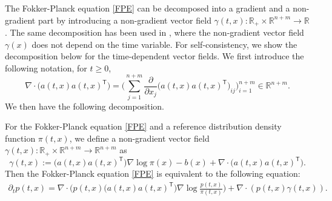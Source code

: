 \documentclass[11pt,reqno]{amsart}
\newcommand{\ts}{\mathsf{T}}
\def\hR{\mathbb{R}}
\def\pa{\partial}
\begin{document}
The Fokker-Planck equation \eqref{FPE} can be decomposed into a gradient and a non-gradient part by introducing a non-gradient vector field $\gamma(t,x):\hR_+\times\hR^{n+m}\rightarrow \hR$. The same decomposition has been used in \cite{FengLi2021}, where the non-gradient vector field $\gamma(x)$ does not depend on the time variable. For self-consistency, we show the decomposition below for the time-dependent vector fields. We first introduce the following notation, for $t\ge 0$, 
\begin{equation}\label{div of matrix}
 \nabla\cdot \Big(a(t,x)a(t,x)^{\ts}\Big)=\Big(\sum_{j=1}^{n+m}\frac{\partial}{\partial x_j}\Big(a(t,x)a(t,x)^{\ts}\Big)_{ij}\Big)_{i=1}^{n+m}\in \mathbb R^{n+m}.
\end{equation}
We then have the following decomposition. 
\begin{proposition}[Decomposition]\label{prop: decomposition}
For the Fokker-Planck equation \eqref{FPE} and a reference distribution density function $\pi(t,x)$, we define a non-gradient vector field $\gamma(t, x): \mathbb R_+\times \mathbb R^{n+m}\rightarrow \mathbb R^{n+m}$ as
 \begin{equation*} 
\gamma(t, x):=  \Big( a(t,x)a(t,x)^{\ts}\Big)\nabla\log \pi(x)-b(x)+\nabla\cdot \Big(a(t,x)a(t,x)^{\ts}\Big).
 \end{equation*}
Then the Fokker-Planck equation \eqref{FPE} {is equivalent to the following equation}:
\begin{equation}\label{FPE1}
\begin{aligned} 
\pa_t p(t,x)=\nabla\cdot \Big(p(t,x)\Big(a(t,x)a(t,x)^{\ts}\Big)\nabla \log \frac{p(t,x)}{\pi(t,x)}\Big)+\nabla\cdot(p(t,x)\gamma(t,x)).
\end{aligned}
\end{equation}
\end{proposition}
\end{document}
